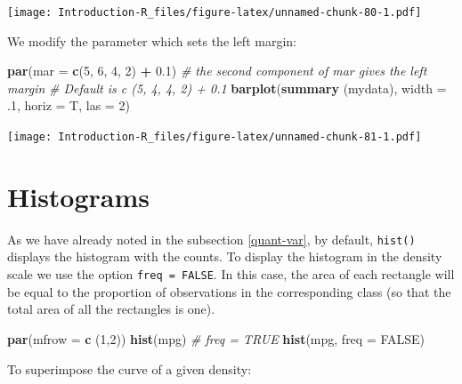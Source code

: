 \documentclass[]{book}
\newenvironment{Shaded}{\begin{snugshade}}{\end{snugshade}}
\newcommand{\CommentTok}[1]{\textcolor[rgb]{0.56,0.35,0.01}{\textit{#1}}}
\newcommand{\DataTypeTok}[1]{\textcolor[rgb]{0.13,0.29,0.53}{#1}}
\newcommand{\DecValTok}[1]{\textcolor[rgb]{0.00,0.00,0.81}{#1}}
\newcommand{\FloatTok}[1]{\textcolor[rgb]{0.00,0.00,0.81}{#1}}
\newcommand{\KeywordTok}[1]{\textcolor[rgb]{0.13,0.29,0.53}{\textbf{#1}}}
\newcommand{\NormalTok}[1]{#1}
\newcommand{\OperatorTok}[1]{\textcolor[rgb]{0.81,0.36,0.00}{\textbf{#1}}}
\newcommand{\OtherTok}[1]{\textcolor[rgb]{0.56,0.35,0.01}{#1}}
\newcommand{\StringTok}[1]{\textcolor[rgb]{0.31,0.60,0.02}{#1}}
\begin{document}
\texttt{[image: Introduction-R\_files/figure-latex/unnamed-chunk-80-1.pdf]}

We modify the parameter which sets the left margin:

\begin{Shaded}
\begin{Highlighting}[]
\KeywordTok{par}\NormalTok{(}\DataTypeTok{mar =} \KeywordTok{c}\NormalTok{(}\DecValTok{5}\NormalTok{, }\DecValTok{6}\NormalTok{, }\DecValTok{4}\NormalTok{, }\DecValTok{2}\NormalTok{) }\OperatorTok{+}\StringTok{ }\FloatTok{0.1}\NormalTok{) }\CommentTok{# the second component of mar gives the left margin}
\CommentTok{# Default is c (5, 4, 4, 2) + 0.1}
\KeywordTok{barplot}\NormalTok{(}\KeywordTok{summary}\NormalTok{ (mydata),}
        \DataTypeTok{width =} \FloatTok{.1}\NormalTok{,}
        \DataTypeTok{horiz =}\NormalTok{ T,}
        \DataTypeTok{las =} \DecValTok{2}\NormalTok{)}
\end{Highlighting}
\end{Shaded}

\texttt{[image: Introduction-R\_files/figure-latex/unnamed-chunk-81-1.pdf]}

\hypertarget{histograms}{%
\section{Histograms}\label{histograms}}

As we have already noted in the subsection \ref{quant-var}, by default, \texttt{hist()} displays the histogram with the counts. To display the histogram in the density scale we use the option \texttt{freq\ =\ FALSE}. In this case, the area of each rectangle will be equal to the proportion of observations in the corresponding class (so that the total area of all the rectangles is one).

\begin{Shaded}
\begin{Highlighting}[]
\KeywordTok{par}\NormalTok{(}\DataTypeTok{mfrow =} \KeywordTok{c}\NormalTok{ (}\DecValTok{1}\NormalTok{,}\DecValTok{2}\NormalTok{))}
\KeywordTok{hist}\NormalTok{(mpg) }\CommentTok{# freq = TRUE}
\KeywordTok{hist}\NormalTok{(mpg, }\DataTypeTok{freq =} \OtherTok{FALSE}\NormalTok{)}
\end{Highlighting}
\end{Shaded}

To superimpose the curve of a given density:
\end{document}

